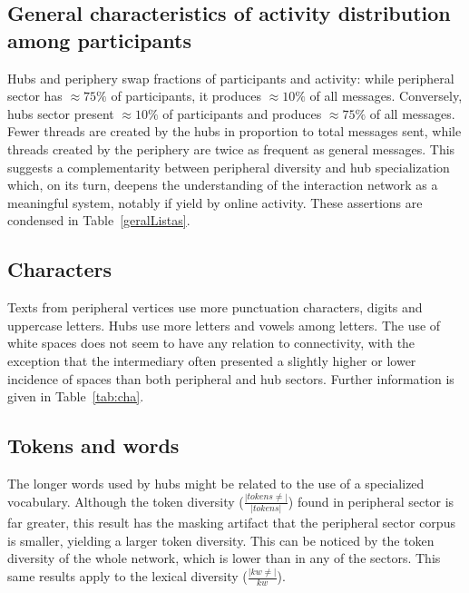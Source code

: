 \subsection{General characteristics of activity distribution among participants}\label{sec:gen}

Hubs and periphery swap fractions of participants and activity:
while peripheral sector has $\approx 75\%$ of participants, it produces $\approx 10\%$ of all messages.
Conversely, hubs sector present $\approx 10\%$ of participants and produces $\approx 75\%$ of all messages.
Fewer threads are created by the hubs in proportion to total messages sent,
while threads created by the periphery are twice as frequent as general messages.
This suggests a complementarity between peripheral diversity and hub specialization
which, on its turn, deepens the understanding of the interaction network as a meaningful system, 
notably if yield by online activity.
These assertions are condensed in Table~\ref{geralListas}.


\subsection{Characters}\label{sec:cha}

Texts from peripheral vertices use more punctuation characters, digits and uppercase letters.
Hubs use more letters and vowels among letters.
The use of white spaces does not seem to have any relation to connectivity,
with the exception that the intermediary often presented a slightly higher or lower
incidence of spaces than both peripheral and hub sectors. 
Further information is given in Table~\ref{tab:cha}.

\subsection{Tokens and words}\label{subsec:tw}
%


The longer words used by hubs might be related to the use of a specialized vocabulary.
Although the token diversity ($\frac{|tokens \neq|}{|tokens|}$) found in peripheral sector is far greater, this result has the masking artifact that the peripheral sector corpus is smaller, yielding a larger token diversity.
This can be noticed by the token diversity of the whole network, which is lower than in any of the sectors.
This same results apply to the lexical diversity ($\frac{|kw\neq|}{kw}$).

